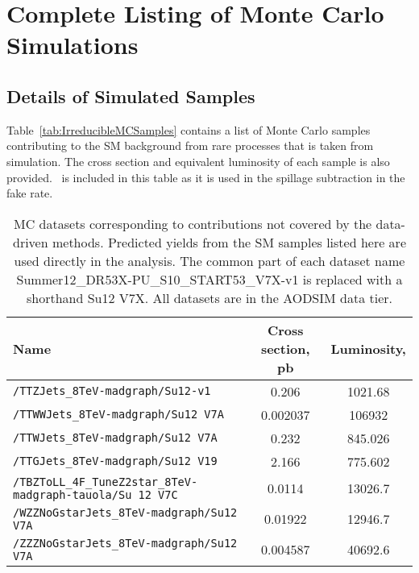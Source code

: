 \chapter{Complete Listing of Monte Carlo Simulations}

\section{Details of Simulated Samples}
\label{sec:mc_details}

Table~\ref{tab:IrreducibleMCSamples} contains a list of Monte Carlo samples contributing to the SM background from rare processes that is taken from simulation.  The cross section and equivalent luminosity of each sample is also provided. \ttZ \ is included in this table as it is used in the spillage subtraction in the fake rate.

\begin{sidewaystable}[H]
\begin{center}
\begin{tabular}{lcc}
\hline\hline
Name														           & Cross section, pb & Luminosity, \fbinv \\ \hline
\verb=/TTZJets_8TeV-madgraph/Su12-v1=                                                                 & 0.206                     &       1021.68         \\ 
\verb=/TTWWJets_8TeV-madgraph/Su12 V7A=                                                            & 0.002037          &      106932       \\ 
\verb=/TTWJets_8TeV-madgraph/Su12 V7A=                                                               & 0.232             &        845.026         \\ 
\verb=/TTGJets_8TeV-madgraph/Su12 V19=                                                                & 2.166             &       775.602          \\ 
\verb=/TBZToLL_4F_TuneZ2star_8TeV-madgraph-tauola/Su 12 V7C=                 &  0.0114             &         13026.7        \\
\verb=/WZZNoGstarJets_8TeV-madgraph/Su12 V7A=                                               & 0.01922           &       12946.7        \\ 
\verb=/ZZZNoGstarJets_8TeV-madgraph/Su12 V7A=                                                 & 0.004587          &     40692.6          \\ 
\hline\hline
\end{tabular}
\caption{\label{tab:App:IrreducibleMCSamples} MC datasets corresponding to contributions not covered by the data-driven methods.
Predicted yields from the SM samples listed here are used directly in the analysis. 
The common part of each dataset name Summer12\_DR53X-PU\_S10\_START53\_V7X-v1 is replaced with a shorthand Su12 V7X. All datasets are in the AODSIM data tier.}
\end{center}
\end{sidewaystable}

